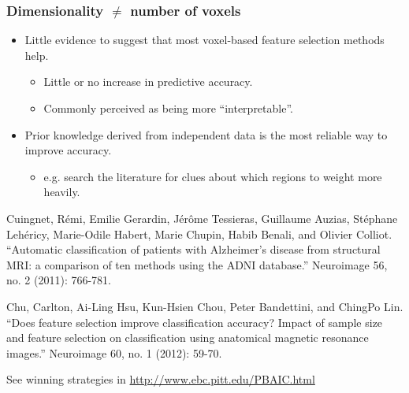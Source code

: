 \begin{frame}
\frametitle{Dimensionality $\ne$ number of voxels}
\begin{itemize}
\item Little evidence to suggest that most voxel-based feature selection methods help.
\begin{itemize}
\item Little or no increase in predictive accuracy.
\item Commonly perceived as being more ``interpretable''.
\end{itemize}
\item Prior knowledge derived from independent data is the most reliable way to improve accuracy.
\begin{itemize}
\item e.g. search the literature for clues about which regions to weight more heavily.
\end{itemize}
\end{itemize}

\vspace{1cm}
{\tiny Cuingnet, R\'emi, Emilie Gerardin, J\'er\^ome Tessieras, Guillaume Auzias, St\'ephane Leh\'ericy, Marie-Odile Habert, Marie Chupin, Habib Benali, and Olivier Colliot. ``Automatic classification of patients with Alzheimer's disease from structural MRI: a comparison of ten methods using the ADNI database.'' Neuroimage 56, no. 2 (2011): 766-781.\par}
{\tiny Chu, Carlton, Ai-Ling Hsu, Kun-Hsien Chou, Peter Bandettini, and ChingPo Lin. ``Does feature selection improve classification accuracy? Impact of sample size and feature selection on classification using anatomical magnetic resonance images.'' Neuroimage 60, no. 1 (2012): 59-70.\par}
{\tiny See winning strategies in \url{http://www.ebc.pitt.edu/PBAIC.html}\par}
\end{frame}


